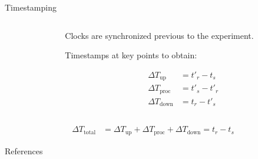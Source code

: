 \documentclass[aspectratio=1610]{beamer}
\begin{document}
\begin{frame}{Timestamping}
    \begin{columns}[onlytextwidth]
        \begin{column}{.5\linewidth}
            \footnotesize%
            \raggedright%
            
        \end{column}%
        \begin{column}{.5\linewidth}
            Clocks are synchronized previous to the experiment.

            \vspace{\baselineskip}%
            Timestamps at key points to obtain:

            \begin{align}
                {\Delta}T_\text{up}   & = t'_{r} - t_{s}  \\
                {\Delta}T_\text{proc} & = t'_{s} - t'_{r} \\
                {\Delta}T_\text{down} & = t_{r} - t'_{s}
            \end{align}
        \end{column}%
    \end{columns}
    \begin{align}
        {\Delta}T_\text{total} & = {\Delta}T_\text{up} + {\Delta}T_\text{proc} + {\Delta}T_\text{down} = t_{r} - t_{s}
    \end{align}
\end{frame}

\begin{frame}[allowframebreaks, t]{References}
    \nocite{*}
    \printbibliography%
\end{frame}
\end{document}
